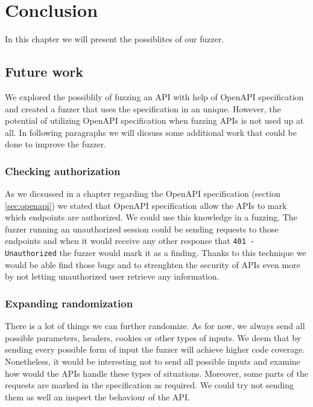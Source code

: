 \chapter{Conclusion}
In this chapter we will present the possiblites of our fuzzer.

\section{Future work}
We explored the possiblily of fuzzing an API with help of OpenAPI specification and created a fuzzer that uses the specification in an unique. However, the potential of utilizing OpenAPI specification when fuzzing APIs is not used up at all. In following paragraphs we will dicsuss some additional work that could be done to improve the fuzzer.

\subsection{Checking authorization}
As we dicsussed in a chapter regarding the OpenAPI specification (section \ref{sec:openapi}) we stated that OpenAPI specification allow the APIs to mark which endpoints are authorized. We could use this knowledge in a fuzzing. The fuzzer running an unauthorized session could be sending requests to those endpoints and when it would receive any other response that \texttt{401 - Unauthorized} the fuzzer would mark it as a finding. Thanks to this technique we would be able find those bugs and to strenghten the security of APIs even more by not letting unauthorized user retrieve any information.

\subsection{Expanding randomization}
There is a lot of things we can further randomize. As for now, we always send all possible parameters, headers, cookies or other types of inputs. We deem that by sending every possible form of input the fuzzer will achieve higher code coverage. Nonetheless, it would be interesting not to send all possible inputs and examine how would the APIs handle these types of situations. Moreover, some parts of the requests are marked in the specification as required. We could try not sending them as well an inspect the behaviour of the API.

